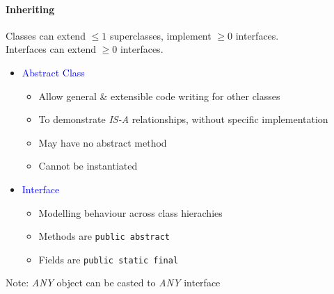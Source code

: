 \paragraph{Inheriting}
Classes can extend $\le1$ superclasses, implement $\ge0$ interfaces.\\
Interfaces can extend $\ge0$ interfaces.
\begin{itemize}
  \item \textcolor{Blue}{Abstract Class}
    \begin{itemize}
      \item Allow general \& extensible code writing for other classes
      \item To demonstrate \emph{IS-A} relationships, without specific implementation
      \item May have no abstract method
      \item Cannot be instantiated
    \end{itemize}
  \item \textcolor{Blue}{Interface}
    \begin{itemize}
      \item Modelling behaviour across class hierachies
      \item Methods are \verb|public abstract|
      \item Fields are \verb|public static final|
    \end{itemize}
\end{itemize}
\textcolor{Bittersweet}{Note}: \emph{ANY} object can be casted to \emph{ANY} interface
